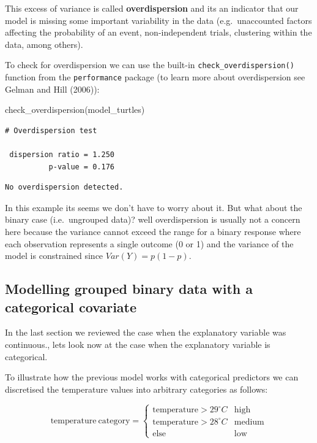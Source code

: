 \documentclass[
  letterpaper,
  DIV=11,
  numbers=noendperiod]{scrartcl}
\newenvironment{Shaded}{\begin{snugshade}}{\end{snugshade}}
\newcommand{\FunctionTok}[1]{\textcolor[rgb]{0.28,0.35,0.67}{#1}}
\newcommand{\NormalTok}[1]{\textcolor[rgb]{0.00,0.23,0.31}{#1}}
\begin{document}
This excess of variance is called \textbf{overdispersion} and its an
indicator that our model is missing some important variability in the
data (e.g.~unaccounted factors affecting the probability of an event,
non-independent trials, clustering within the data, among others).

To check for overdispersion we can use the built-in
\texttt{check\_overdispersion()} function from the \texttt{performance}
package (to learn more about overdispersion see Gelman and Hill (2006)):

\begin{Shaded}
\begin{Highlighting}[]
\FunctionTok{check\_overdispersion}\NormalTok{(model\_turtles)}
\end{Highlighting}
\end{Shaded}

\begin{verbatim}
# Overdispersion test

 dispersion ratio = 1.250
          p-value = 0.176
\end{verbatim}

\begin{verbatim}
No overdispersion detected.
\end{verbatim}

In this example its seems we don't have to worry about it. But what
about the binary case (i.e.~ungrouped data)? well overdispersion is
usually not a concern here because the variance cannot exceed the range
for a binary response where each observation represents a single outcome
(0 or 1) and the variance of the model is constrained since
\(Var(Y) = p(1-p)\).

\subsection{Modelling grouped binary data with a categorical
covariate}\label{modelling-grouped-binary-data-with-a-categorical-covariate}

In the last section we reviewed the case when the explanatory variable
was continuous., lets look now at the case when the explanatory variable
is categorical.

To illustrate how the previous model works with categorical predictors
we can discretised the temperature values into arbitrary categories as
follows:

\[
\mathrm{temperature~ category} =\begin{cases} \mathrm{temperature} > 29^\circ C  &  \text{high} \\ \mathrm{temperature} > 28^\circ C& \text{medium} \\ \text{else} & \text{low}\end{cases}
\]
\end{document}
